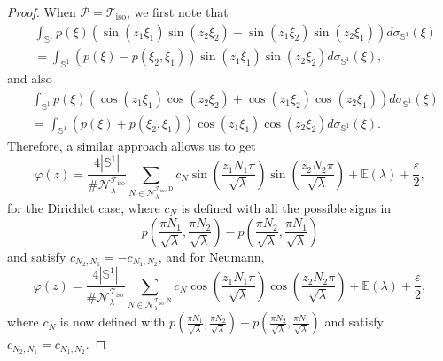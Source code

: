 \documentclass{amsart}
\theoremstyle{definition}
\theoremstyle{remark}
\newcommand{\ep}{\varepsilon}
\newcommand{\si}{\sigma}
\newcommand{\vp}{\varphi}
\numberwithin{equation}{section}
\theoremstyle{definition}
\theoremstyle{remark}
\begin{document}
\begin{proof}
	When $\mathcal{P}=\mathcal{T}_\mathrm{iso}$, we first note that
	\begin{equation}
		\begin{aligned}
			&\int_{\mathbb{S}^{1}}p(\xi)\left(\sin(z_1\xi_1)\sin(z_2\xi_2)-\sin(z_1\xi_2)\sin(z_2\xi_1)\right)d\si_{\mathbb{S}^{1}}(\xi)\\&=\int_{\mathbb{S}^{1}}\left(p(\xi)-p(\xi_2,\xi_1)\right)\sin(z_1\xi_1)\sin(z_2\xi_2)d\si_{\mathbb{S}^{1}}(\xi), 
		\end{aligned}
	\end{equation}and also \begin{equation}
		\begin{aligned}
			&\int_{\mathbb{S}^{1}}p(\xi)\left(\cos(z_1\xi_1)\cos(z_2\xi_2)+\cos(z_1\xi_2)\cos(z_2\xi_1)\right)d\si_{\mathbb{S}^{1}}(\xi)\\&=\int_{\mathbb{S}^{1}}\left(p(\xi)+p(\xi_2,\xi_1)\right)\cos(z_1\xi_1)\cos(z_2\xi_2)d\si_{\mathbb{S}^{1}}(\xi).
		\end{aligned}
	\end{equation}Therefore, a similar approach allows us to get 
	\begin{equation}
		\vp(z)=\frac{4|\mathbb{S}^1|}{\#\mathcal{N}_\lambda^{\mathcal{T}_\mathrm{iso}}}\sum_{N\in \mathcal{N}_\lambda^{\mathcal{T}_\mathrm{iso},\mathrm{D}}}c_N \sin\left(\frac{z_1N_1\pi}{\sqrt{\lambda}}\right)\sin\left(\frac{z_2N_2\pi}{\sqrt{\lambda}}\right)+\mathbb{E}(\lambda)+\frac{\ep}{2},
	\end{equation} for the Dirichlet case, where $c_N$ is defined with all the possible signs in 
    $$
    p\left(\frac{\pi N_1}{\sqrt{\lambda}},\frac{\pi N_2}{\sqrt{\lambda}}\right)-p\left(\frac{\pi N_2}{\sqrt{\lambda}},\frac{\pi N_1}{\sqrt{\lambda}}\right)
    $$ and satisfy $c_{N_2,N_1}=-c_{N_1,N_2}$, and for Neumann,
	\begin{equation}
		\vp(z)=\frac{4|\mathbb{S}^1|}{\#\mathcal{N}_\lambda^{\mathcal{T}_\mathrm{iso}}}\sum_{N\in \mathcal{N}_\lambda^{\mathcal{T}_\mathrm{iso},\mathrm{N}}}c_N \cos\left(\frac{z_1N_1\pi}{\sqrt{\lambda}}\right)\cos\left(\frac{z_2N_2\pi}{\sqrt{\lambda}}\right)+\mathbb{E}(\lambda)+\frac{\ep}{2},
	\end{equation}where $c_N$ is now defined with $p\left(\frac{\pi N_1}{\sqrt{\lambda}},\frac{\pi N_2}{\sqrt{\lambda}}\right)+p\left(\frac{\pi N_2}{\sqrt{\lambda}},\frac{\pi N_1}{\sqrt{\lambda}}\right)$ and satisfy $c_{N_2,N_1}=c_{N_1,N_2}$.
	

\end{proof}
\end{document}

